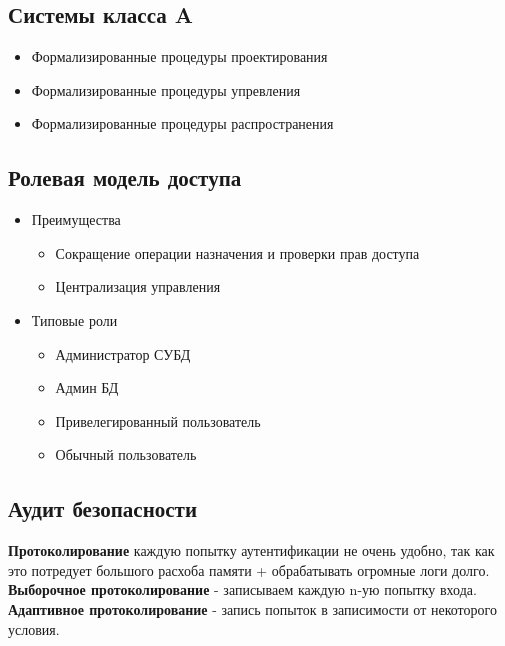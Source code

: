 \documentclass{article}
\begin{document}
    \subsection{Системы класса A}
    \begin{itemize}
        \item Формализированные процедуры проектирования
        \item Формализированные процедуры упревления
        \item Формализированные процедуры распространения 
    \end{itemize}
    
    \subsection{Ролевая модель доступа}
    \begin{itemize}
        \item Преимущества
        \begin{itemize}
            \item Сокращение операции назначения и проверки прав доступа
            \item Централизация управления
        \end{itemize}
        \item Типовые роли 
        \begin{itemize}
            \item Администратор СУБД
            \item Админ БД
            \item Привелегированный пользователь
            \item Обычный пользователь
        \end{itemize}
    \end{itemize}
    
    \subsection{Аудит безопасности}
    
    \textbf{Протоколирование}
     каждую попытку аутентификации не очень удобно, так как это потредует большого расхоба памяти + обрабатывать огромные логи долго.
    \newline \textbf{Выборочное протоколирование} - записываем каждую n-ую попытку входа.
    \newline \textbf{Адаптивное протоколирование} - запись попыток в записимости от некоторого условия.
    
\end{document}
